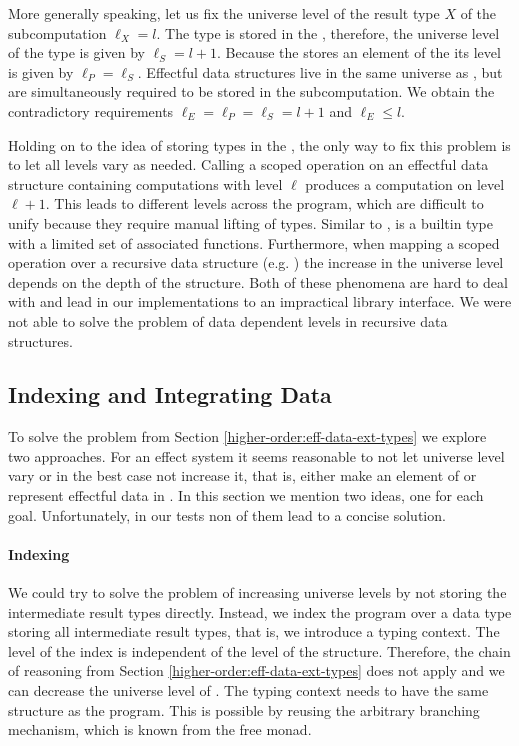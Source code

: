 More generally speaking, let us fix the universe level of the result type $X$ of
the subcomputation $\ell_X = l$.
The type is stored in the , therefore, the universe level of the
 type is given by $\ell_S = l + 1$.
Because the  stores an element of the  its
level is given by $\ell_P = \ell_S$.
Effectful data structures live in the same universe as , but
are simultaneously required to be stored in the subcomputation.
We obtain the contradictory requirements $\ell_E = \ell_P = \ell_S = l + 1$ and
$\ell_E  \leqslant l$.

Holding on to the idea of storing types in the , the only way to
fix this problem is to let all levels vary as needed.
Calling a scoped operation on an effectful data structure containing
computations with level $\ell$ produces a computation on level $\ell + 1$.
This leads to different levels across the program, which are difficult to unify
because they require manual lifting of types.
Similar to ,  is a builtin type with a
limited set of associated functions.
Furthermore, when mapping a scoped operation over a recursive data structure
(e.g. ) the increase in the universe level depends on the
depth of the structure.
Both of these phenomena are hard to deal with and lead in our implementations to
an impractical library interface.
We were not able to solve the problem of data dependent levels in recursive data
structures.


\subsection{Indexing and Integrating Data}
\label{higher-order:fixes}

To solve the problem from Section \ref{higher-order:eff-data-ext-types} we
explore two approaches.
For an effect system it seems reasonable to not let universe level vary or in
the best case not increase it, that is, either make  an
element of  or represent effectful data in .
In this section we mention two ideas, one for each goal.
Unfortunately, in our tests non of them lead to a concise solution.

\paragraph{Indexing}
We could try to solve the problem of increasing universe levels by not storing
the intermediate result types directly.
Instead, we index the program over a data type storing all intermediate result
types, that is, we introduce a typing context.
The level of the index is independent of the level of the structure.
Therefore, the chain of reasoning from Section
\ref{higher-order:eff-data-ext-types} does not apply and we can decrease the
universe level of .
The typing context needs to have the same structure as the program.
This is possible by reusing the arbitrary branching mechanism, which is known
from the free monad.

